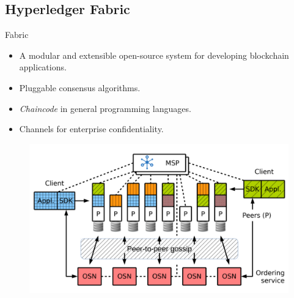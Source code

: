 \subsection{Hyperledger Fabric}
\begin{frame}{Fabric}
    \begin{itemize}
        \item A modular and extensible open-source system for
              developing blockchain applications.
        \item Pluggable consensus algorithms.
        \item \textit{Chaincode} in general programming languages.
        \item Channels for enterprise confidentiality.
    \end{itemize}
    \begin{figure}
        \includegraphics[height=0.4\textheight, width=\linewidth,
            keepaspectratio]{photos/fabric.png}
        \centering
    \end{figure}
\end{frame}
